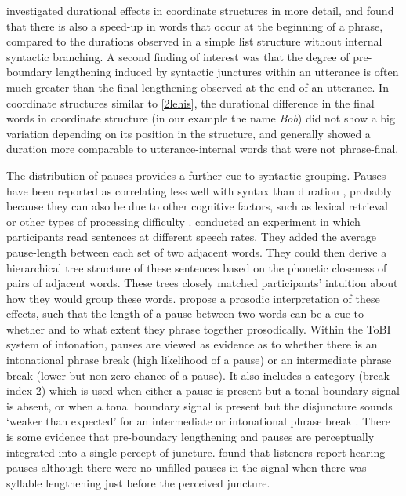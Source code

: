 \documentclass[preprint,review,12pt,authoryear,times]{elsarticle}
\begin{document}
 \citet{wagner05recursion} investigated durational effects in coordinate structures in more detail, and found that there is also a speed-up in words that occur at the beginning of a phrase, compared to the durations observed in a simple list structure without internal syntactic branching. A second finding of interest was that the degree of pre-boundary lengthening induced by syntactic junctures within an utterance is often much greater than the final lengthening observed at the end of an utterance. In coordinate structures similar to \ref{2lehis},  the durational difference in the final words in coordinate structure (in our example the name {\em Bob}) did not show a big variation depending on its position in the structure, and generally showed a duration more comparable to utterance-internal words that were not phrase-final. 
 
The distribution of pauses provides a further cue to syntactic grouping. Pauses have been reported as correlating less well with syntax than duration \citep{gollr13}, probably because they can also be due to other cognitive factors, such as lexical retrieval or other types of processing difficulty \citep{goldm72}. \citet{grosj79} conducted an experiment in which participants read sentences at different speech rates. They added the average pause-length between each set of two adjacent words. They could then derive a hierarchical tree structure of these sentences based on the phonetic closeness of pairs of adjacent words. These trees  closely matched participants' intuition about how they would group these words.  \citet{gee83} propose a prosodic interpretation of these effects, such that the length of a pause between two words can be a cue to whether and to what extent they phrase together prosodically. Within the ToBI system of intonation, pauses are viewed as evidence as to whether there is an intonational phrase break (high likelihood of a pause) or an intermediate phrase break (lower but non-zero chance of a pause). It also includes a category (break-index 2) which is used when either a pause is present but a tonal boundary signal is absent, or when a tonal boundary signal is present but the disjuncture sounds `weaker than expected' for an intermediate or intonational phrase break \citep[35]{beckm97} . There is some evidence that pre-boundary lengthening and pauses are perceptually integrated into a single percept of juncture. \citet{Marti70, Marti71} found that listeners report hearing pauses although there were no unfilled pauses in the signal when there was syllable lengthening just before the perceived juncture. 
\end{document}
